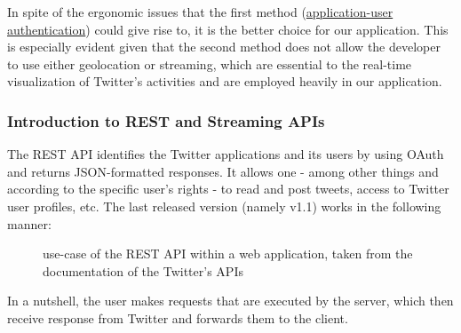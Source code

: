 \documentclass[a4paper,11pt]{report}
\begin{document}
In spite of the ergonomic issues that the first method (\underline{application-user authentication}) could give rise to, it is the better choice for our application. This is especially evident given that the second method does not allow the developer to use either geolocation or streaming, which are essential to the real-time visualization of Twitter's activities and are employed heavily in our application.
\newpage

\subsubsection{Introduction to REST and Streaming APIs}
The REST API identifies the Twitter applications and its users by using OAuth and returns JSON-formatted responses. It allows one - among other things and according to the specific user's rights - to read and post tweets, access to Twitter user profiles, etc. The last released version (namely v1.1) works in the following manner:
\begin{figure}[H]
\vspace{-5pt}
\begin{center}
\vspace{-5pt}
\caption{use-case of the REST API within a web application, taken from the documentation of the Twitter's APIs}
\end{center}
\end{figure}

In a nutshell, the user makes requests that are executed by the server, which then receive response from Twitter and forwards them to the client.\\
\end{document}
